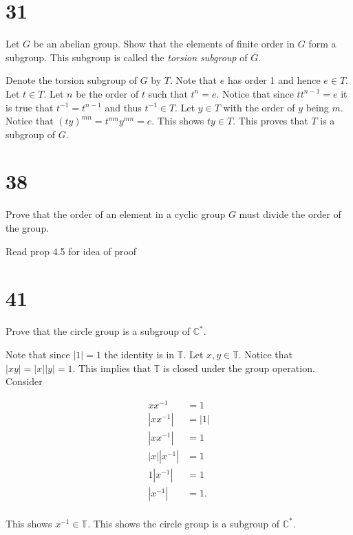 \documentclass[a4paper]{article}
\begin{document}
\section*{31}


Let $G$ be an abelian group. Show that the elements of finite order in $G$ form a subgroup. This subgroup is called the \textit{torsion subgroup} of $G$.

\vspace{\baselineskip}

Denote the torsion subgroup of $G$ by $T$. Note that $e$ has order 1 and hence $e \in T$. Let $t \in T$. Let $n$ be the order of $t$ such that $t^n = e$. Notice that since $tt^{n-1} = e$ it is true that $t^{-1} = t^{n-1}$ and thus $t^{-1} \in T$. Let $y \in T$ with the order of $y$ being $m$. Notice that $(ty)^{mn} = t^{mn}y^{mn} = e$. This shows $ty \in T$. This proves that $T$ is a subgroup of $G$. 


\section*{38}

Prove that the order of an element in a cyclic group $G$ must divide the order of the group.

\vspace{\baselineskip}

Read prop 4.5 for idea of proof


\section*{41}

Prove that the circle group is a subgroup of $\mathbb{C}^*$.

\vspace{\baselineskip}

Note that since $|1| = 1$ the identity is in $\mathbb{T}$. Let $x,y \in \mathbb{T}$. Notice that $|xy| = |x||y| = 1$. This implies that $\mathbb{T}$ is closed under the group operation. Consider 

\begin{align*}
x x^{-1} &= 1 \\
|x x ^{-1}| &= |1| \\
|x x ^{-1}| &= 1 \\
|x| |x ^{-1}| &= 1 \\
1 | x ^{-1}| &= 1 \\
|x ^{-1}| &= 1 .\\
\end{align*}

This shows $x^{-1} \in \mathbb{T}$. This shows the circle group is a subgroup of $\mathbb{C}^*$.
\end{document}
